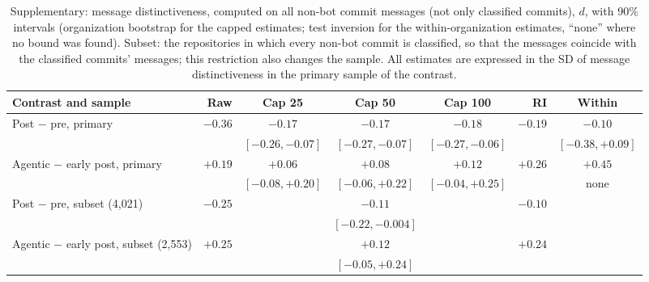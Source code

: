 \begin{table}[!htbp]
\caption{Supplementary: message distinctiveness, computed on all non-bot commit messages (not only classified commits), $d$, with 90\% intervals (organization bootstrap for the capped estimates; test inversion for the within-organization estimates, ``none'' where no bound was found). Subset: the repositories in which every non-bot commit is classified, so that the messages coincide with the classified commits' messages; this restriction also changes the sample. All estimates are expressed in the SD of message distinctiveness in the primary sample of the contrast.}
\label{tab:msg}
\scriptsize
\setlength{\tabcolsep}{2.5pt}
\begin{tabular}{@{}p{2.6cm} r c c c r c@{}}
\toprule
Contrast and sample & Raw & Cap 25 & Cap 50 & Cap 100 & RI & Within \\
\midrule
Post $-$ pre, primary & $-0.36$ & $-0.17$ & $-0.17$ & $-0.18$ & $-0.19$ & $-0.10$ \\
 & & $[-0.26, -0.07]$ & $[-0.27, -0.07]$ & $[-0.27, -0.06]$ & & $[-0.38, +0.09]$ \\[2pt]
Agentic $-$ early post, primary & $+0.19$ & $+0.06$ & $+0.08$ & $+0.12$ & $+0.26$ & $+0.45$ \\
 & & $[-0.08, +0.20]$ & $[-0.06, +0.22]$ & $[-0.04, +0.25]$ & & none \\[2pt]
Post $-$ pre, subset (4,021) & $-0.25$ & & $-0.11$ & & $-0.10$ & \\
 & & & $[-0.22, -0.004]$ & & & \\[2pt]
Agentic $-$ early post, subset (2,553) & $+0.25$ & & $+0.12$ & & $+0.24$ & \\
 & & & $[-0.05, +0.24]$ & & & \\[2pt]
\bottomrule
\end{tabular}
\end{table}
